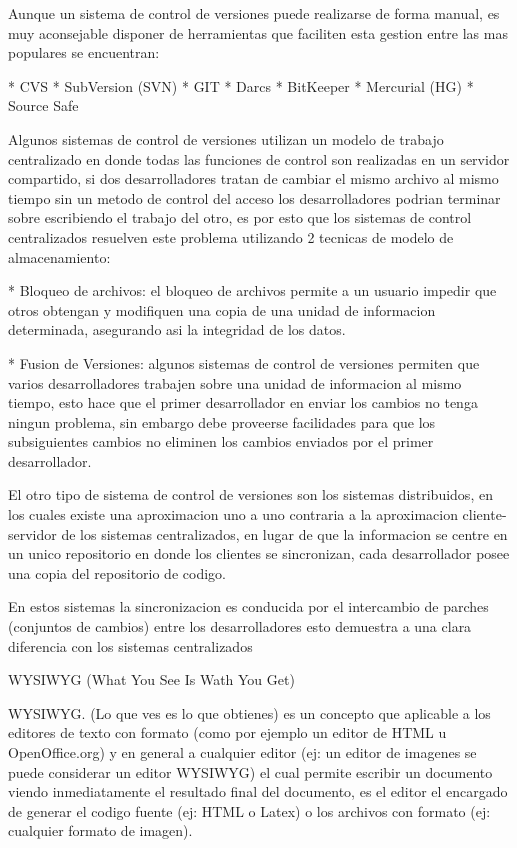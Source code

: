 Aunque un sistema de control de versiones puede realizarse de forma manual, es muy aconsejable disponer de herramientas que faciliten esta gestion entre las mas populares se encuentran:

* CVS
* SubVersion (SVN)
* GIT
* Darcs
* BitKeeper
* Mercurial (HG)
* Source Safe

Algunos sistemas de control de versiones utilizan un modelo de trabajo centralizado en donde todas las funciones de control son realizadas en un servidor compartido, si dos desarrolladores tratan de cambiar el mismo archivo al mismo tiempo sin un metodo de control del acceso los desarrolladores podrian terminar sobre escribiendo el trabajo del otro, es por esto que los sistemas de control centralizados resuelven este problema utilizando 2 tecnicas de modelo de almacenamiento:

* Bloqueo de archivos: el bloqueo de archivos permite a un usuario impedir que otros obtengan y modifiquen una copia de una unidad de informacion determinada, asegurando asi la integridad de los datos.

* Fusion de Versiones: algunos sistemas de control de versiones permiten que varios desarrolladores trabajen sobre una unidad de informacion al mismo tiempo, esto hace que el primer desarrollador en enviar los cambios no tenga ningun problema, sin embargo debe proveerse facilidades para que los subsiguientes cambios no eliminen los cambios enviados por el primer desarrollador.

El otro tipo de sistema de control de versiones son los sistemas distribuidos, en los cuales existe una aproximacion uno a uno contraria a la aproximacion cliente-servidor de los sistemas centralizados, en lugar de que la informacion se centre en un unico repositorio en donde los clientes se sincronizan, cada desarrollador posee una copia del repositorio de codigo.

En estos sistemas la sincronizacion es conducida por el intercambio de parches (conjuntos de cambios) entre los desarrolladores esto demuestra a una clara diferencia con los sistemas centralizados



WYSIWYG (What You See Is Wath You Get)

WYSIWYG. (Lo que ves es lo que obtienes) es un concepto que aplicable a los editores de texto con formato (como por ejemplo un editor de HTML u OpenOffice.org) y en general a cualquier editor (ej: un editor de imagenes se puede considerar un editor WYSIWYG) el cual permite escribir un documento viendo inmediatamente el resultado final del documento, es el editor el encargado de generar el codigo fuente (ej: HTML o Latex) o los archivos con formato (ej: cualquier formato de imagen).

